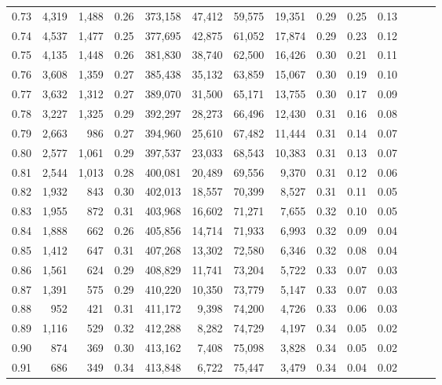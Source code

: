 \begin{tabular}{rrrrrrrrrrrrrr}
0.73 &  4,319 &  1,488 &  0.26 &  373,158 &   47,412 &  59,575 &  19,351 &  0.29 &  0.25 &      0.13 \\
0.74 &  4,537 &  1,477 &  0.25 &  377,695 &   42,875 &  61,052 &  17,874 &  0.29 &  0.23 &      0.12 \\
0.75 &  4,135 &  1,448 &  0.26 &  381,830 &   38,740 &  62,500 &  16,426 &  0.30 &  0.21 &      0.11 \\
0.76 &  3,608 &  1,359 &  0.27 &  385,438 &   35,132 &  63,859 &  15,067 &  0.30 &  0.19 &      0.10 \\
0.77 &  3,632 &  1,312 &  0.27 &  389,070 &   31,500 &  65,171 &  13,755 &  0.30 &  0.17 &      0.09 \\
0.78 &  3,227 &  1,325 &  0.29 &  392,297 &   28,273 &  66,496 &  12,430 &  0.31 &  0.16 &      0.08 \\
0.79 &  2,663 &    986 &  0.27 &  394,960 &   25,610 &  67,482 &  11,444 &  0.31 &  0.14 &      0.07 \\
0.80 &  2,577 &  1,061 &  0.29 &  397,537 &   23,033 &  68,543 &  10,383 &  0.31 &  0.13 &      0.07 \\
0.81 &  2,544 &  1,013 &  0.28 &  400,081 &   20,489 &  69,556 &   9,370 &  0.31 &  0.12 &      0.06 \\
0.82 &  1,932 &    843 &  0.30 &  402,013 &   18,557 &  70,399 &   8,527 &  0.31 &  0.11 &      0.05 \\
0.83 &  1,955 &    872 &  0.31 &  403,968 &   16,602 &  71,271 &   7,655 &  0.32 &  0.10 &      0.05 \\
0.84 &  1,888 &    662 &  0.26 &  405,856 &   14,714 &  71,933 &   6,993 &  0.32 &  0.09 &      0.04 \\
0.85 &  1,412 &    647 &  0.31 &  407,268 &   13,302 &  72,580 &   6,346 &  0.32 &  0.08 &      0.04 \\
0.86 &  1,561 &    624 &  0.29 &  408,829 &   11,741 &  73,204 &   5,722 &  0.33 &  0.07 &      0.03 \\
0.87 &  1,391 &    575 &  0.29 &  410,220 &   10,350 &  73,779 &   5,147 &  0.33 &  0.07 &      0.03 \\
0.88 &    952 &    421 &  0.31 &  411,172 &    9,398 &  74,200 &   4,726 &  0.33 &  0.06 &      0.03 \\
0.89 &  1,116 &    529 &  0.32 &  412,288 &    8,282 &  74,729 &   4,197 &  0.34 &  0.05 &      0.02 \\
0.90 &    874 &    369 &  0.30 &  413,162 &    7,408 &  75,098 &   3,828 &  0.34 &  0.05 &      0.02 \\
0.91 &    686 &    349 &  0.34 &  413,848 &    6,722 &  75,447 &   3,479 &  0.34 &  0.04 &      0.02 \\

\end{tabular}
